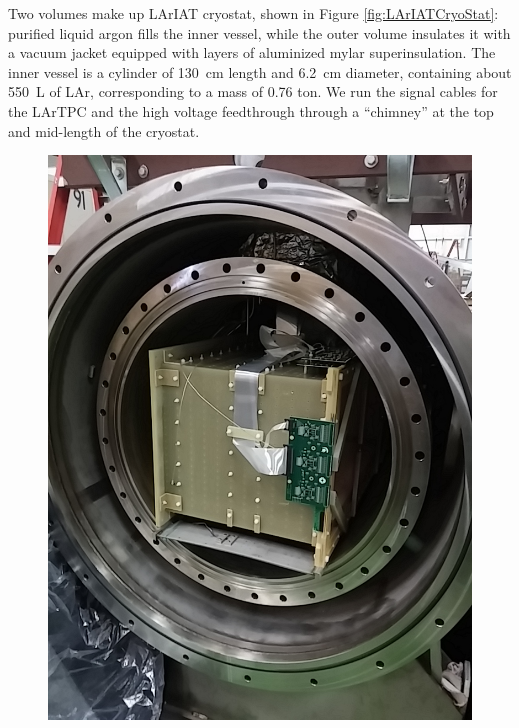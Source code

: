 Two volumes make up LArIAT cryostat, shown in Figure \ref{fig:LArIATCryoStat}: purified liquid argon fills the inner vessel, while the outer volume insulates it with a vacuum jacket equipped with layers of aluminized mylar superinsulation. The inner vessel is a cylinder of 130~cm length and 6.2~cm diameter, containing about 550~L of LAr, corresponding to a mass of 0.76 ton. We run the signal cables for the LArTPC and the high voltage feedthrough through a ``chimney'' at the top and mid-length of the cryostat.


\begin{figure}[htb]
\centering
\includegraphics[scale=0.18]{Chapter-3/Images/Cryostat1.jpg}

\end{figure}
